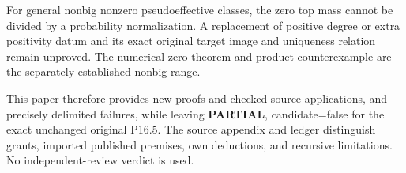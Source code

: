 \documentclass[
  10pt,
]{article}
\begin{document}
For general nonbig nonzero pseudoeffective classes, the zero top mass
cannot be divided by a probability normalization. A replacement of
positive degree or extra positivity datum and its exact original target
image and uniqueness relation remain unproved. The numerical-zero
theorem and product counterexample are the separately established nonbig
range.

This paper therefore provides new proofs and checked source
applications, and precisely delimited failures, while leaving
\textbf{PARTIAL}, candidate=false for the exact unchanged original
P16.5. The source appendix and ledger distinguish grants, imported
published premises, own deductions, and recursive limitations. No
independent-review verdict is used.
\end{document}
